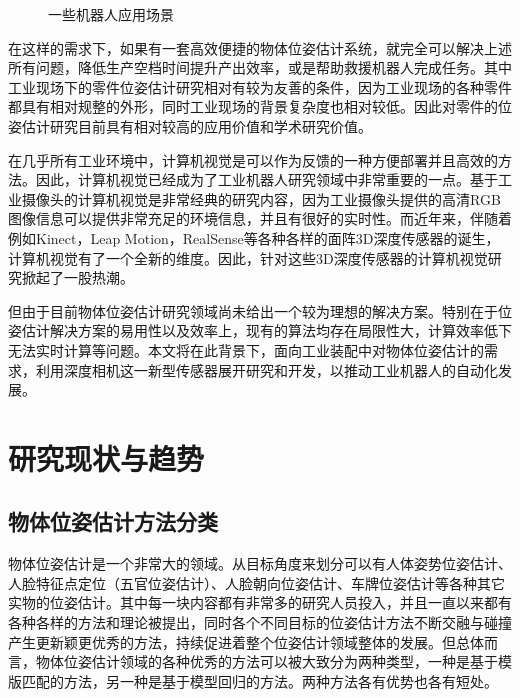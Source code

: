 \begin{figure}[htb]
{\begin{minipage}[b]{0.5\textwidth}
		\end{minipage}}
	\caption{一些机器人应用场景}
\end{figure}

在这样的需求下，如果有一套高效便捷的物体位姿估计系统，就完全可以解决上述所有问题，降低生产空档时间提升产出效率，或是帮助救援机器人完成任务。其中工业现场下的零件位姿估计研究相对有较为友善的条件，因为工业现场的各种零件都具有相对规整的外形，同时工业现场的背景复杂度也相对较低。因此对零件的位姿估计研究目前具有相对较高的应用价值和学术研究价值。

在几乎所有工业环境中，计算机视觉是可以作为反馈的一种方便部署并且高效的方法。因此，计算机视觉已经成为了工业机器人研究领域中非常重要的一点。基于工业摄像头的计算机视觉是非常经典的研究内容，因为工业摄像头提供的高清RGB图像信息可以提供非常充足的环境信息，并且有很好的实时性。而近年来，伴随着例如Kinect，Leap Motion，RealSense等各种各样的面阵3D深度传感器的诞生，计算机视觉有了一个全新的维度。因此，针对这些3D深度传感器的计算机视觉研究掀起了一股热潮。

但由于目前物体位姿估计研究领域尚未给出一个较为理想的解决方案。特别在于位姿估计解决方案的易用性以及效率上，现有的算法均存在局限性大，计算效率低下无法实时计算等问题。本文将在此背景下，面向工业装配中对物体位姿估计的需求，利用深度相机这一新型传感器展开研究和开发，以推动工业机器人的自动化发展。


\section{研究现状与趋势} 

\subsection{物体位姿估计方法分类} %


物体位姿估计是一个非常大的领域。从目标角度来划分可以有人体姿势位姿估计、人脸特征点定位（五官位姿估计）、人脸朝向位姿估计、车牌位姿估计等各种其它实物的位姿估计。其中每一块内容都有非常多的研究人员投入，并且一直以来都有各种各样的方法和理论被提出，同时各个不同目标的位姿估计方法不断交融与碰撞产生更新颖更优秀的方法，持续促进着整个位姿估计领域整体的发展。但总体而言，物体位姿估计领域的各种优秀的方法可以被大致分为两种类型，一种是基于模版匹配的方法，另一种是基于模型回归的方法。两种方法各有优势也各有短处。

